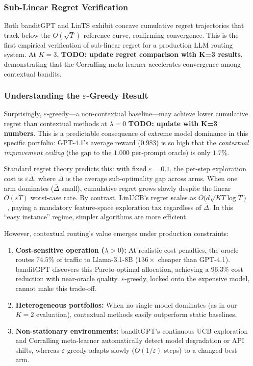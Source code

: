 \subsubsection{Sub-Linear Regret Verification}

Both banditGPT and LinTS exhibit concave cumulative regret trajectories
that track below the $O(\sqrt{T})$ reference curve, confirming convergence.
This is the first empirical verification of sub-linear regret for a production
LLM routing system.  At $K{=}3$, \textbf{TODO: update regret comparison with K=3 results}, demonstrating that the
Corralling meta-learner accelerates convergence among contextual bandits.

\subsubsection{Understanding the $\varepsilon$-Greedy Result}
\label{sec:egreedy_analysis}

Surprisingly, $\varepsilon$-greedy---a non-contextual baseline---may achieve lower cumulative regret than contextual methods at $\lambda{=}0$ \textbf{TODO: update with K=3 numbers}. This is a predictable consequence of extreme model dominance in this specific portfolio: GPT-4.1's average reward ($0.983$) is so high that the \emph{contextual improvement ceiling} (the gap to the $1.000$ per-prompt oracle) is only $1.7\%$. 

Standard regret theory predicts this: with fixed $\varepsilon{=}0.1$, the per-step exploration cost is $\varepsilon \bar{\Delta}$, where $\bar{\Delta}$ is the average sub-optimality gap across arms. When one arm dominates ($\bar{\Delta}$ small), cumulative regret grows slowly despite the linear $O(\varepsilon T)$ worst-case rate. By contrast, LinUCB's regret scales as $O\!\bigl(d\sqrt{KT\log T}\bigr)$~\cite{abbasi2011improved}, paying a mandatory feature-space exploration tax regardless of $\bar{\Delta}$. In this ``easy instance'' regime, simpler algorithms are more efficient.

However, contextual routing's value emerges under production constraints:
\begin{enumerate}[leftmargin=*,nosep]
  \item \textbf{Cost-sensitive operation ($\lambda > 0$):} At realistic cost penalties, the oracle routes $74.5\%$ of traffic to Llama-3.1-8B ($136\times$ cheaper than GPT-4.1). banditGPT discovers this Pareto-optimal allocation, achieving a $96.3\%$ cost reduction with near-oracle quality. $\varepsilon$-greedy, locked onto the expensive model, cannot make this trade-off.
  \item \textbf{Heterogeneous portfolios:} When no single model dominates (as in our $K{=}2$ evaluation), contextual methods easily outperform static baselines.
  \item \textbf{Non-stationary environments:} banditGPT's continuous UCB exploration and Corralling meta-learner automatically detect model degradation or API shifts, whereas $\varepsilon$-greedy adapts slowly ($O(1/\varepsilon)$ steps) to a changed best arm.
\end{enumerate}
